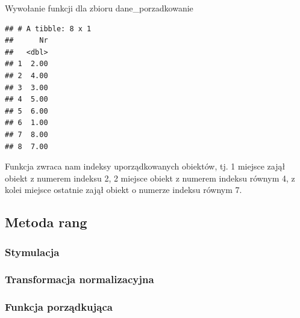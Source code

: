 \documentclass[12pt,a4paper]{report}
\begin{document}
{Wywołanie funkcji dla zbioru dane\_porzadkowanie 

\begin{Shaded}
\begin{Highlighting}[]
\end{Highlighting}
\end{Shaded}

\begin{verbatim}
## # A tibble: 8 x 1
##      Nr
##   <dbl>
## 1  2.00
## 2  4.00
## 3  3.00
## 4  5.00
## 5  6.00
## 6  1.00
## 7  8.00
## 8  7.00
\end{verbatim}

Funkcja zwraca nam indeksy uporządkowanych obiektów, tj. 1 miejsce
zajął obiekt z numerem indeksu 2, 2 miejsce obiekt z numerem indeksu
równym 4, z kolei miejsce ostatnie zajął obiekt o numerze indeksu równym
7.

\subsection{Metoda rang}
\subsubsection{Stymulacja} 
\begin{Shaded}
\begin{Highlighting}[]
\NormalTok{)} 
\end{Highlighting}
\end{Shaded}


\subsubsection{Transformacja normalizacyjna}
\begin{Shaded}
\begin{Highlighting}[]
\end{Highlighting}
\end{Shaded}

\subsubsection{Funkcja porządkująca}\label{funkcja-porzadkujaca-metoda-rang}

}
\end{document}
